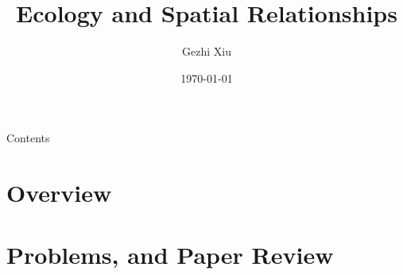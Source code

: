 \documentclass{beamer}
\title[Growth Models]{Ecology and Spatial Relationships}
\author[G. Xiu]{Gezhi Xiu} %
\institute[IRSGIS PKU]{Complexity Research Group,\\Peking University}
\date[\today]{\today}
\begin{document}
\maketitle
\begin{frame}{Contents}
\tableofcontents
\end{frame}

\section{Overview}

\section{Problems, and Paper Review}





\end{document}
